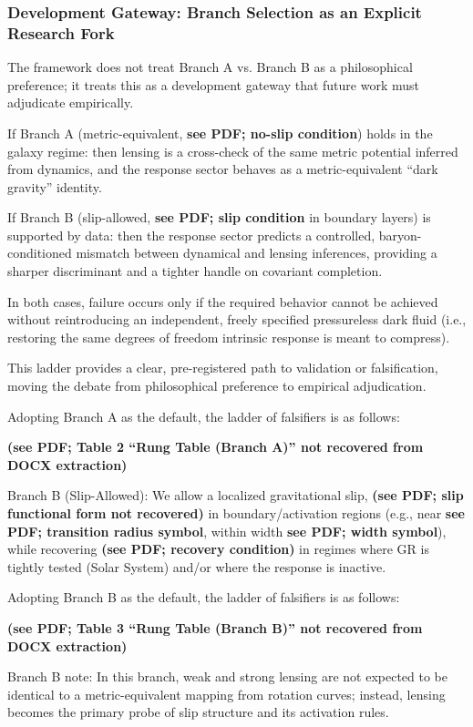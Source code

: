 \subsubsection{Development Gateway: Branch Selection as an Explicit Research Fork}

The framework does not treat Branch A vs.
Branch B as a philosophical preference; it treats this as a development gateway that future work must adjudicate empirically.

If Branch A (metric-equivalent, \textbf{see PDF; no-slip condition}) holds in the galaxy regime: then lensing is a cross-check of the same metric potential inferred from dynamics, and the response sector behaves as a metric-equivalent ``dark gravity'' identity.

If Branch B (slip-allowed, \textbf{see PDF; slip condition} in boundary layers) is supported by data: then the response sector predicts a controlled, baryon-conditioned mismatch between dynamical and lensing inferences, providing a sharper discriminant and a tighter handle on covariant completion.

In both cases, failure occurs only if the required behavior cannot be achieved without reintroducing an independent, freely specified pressureless dark fluid (i.e., restoring the same degrees of freedom intrinsic response is meant to compress).

This ladder provides a clear, pre-registered path to validation or falsification, moving the debate from philosophical preference to empirical adjudication.

Adopting Branch A as the default, the ladder of falsifiers is as follows:

\textbf{(see PDF; Table 2 ``Rung Table (Branch A)'' not recovered from DOCX extraction)}

Branch B (Slip-Allowed): We allow a localized gravitational slip,
\textbf{(see PDF; slip functional form not recovered)}
in boundary/activation regions (e.g., near \textbf{see PDF; transition radius symbol}, within width \textbf{see PDF; width symbol}), while recovering \textbf{(see PDF; recovery condition)} in regimes where GR is tightly tested (Solar System) and/or where the response is inactive.

Adopting Branch B as the default, the ladder of falsifiers is as follows:

\textbf{(see PDF; Table 3 ``Rung Table (Branch B)'' not recovered from DOCX extraction)}

Branch B note: In this branch, weak and strong lensing are not expected to be identical to a metric-equivalent mapping from rotation curves; instead, lensing becomes the primary probe of slip structure and its activation rules.

